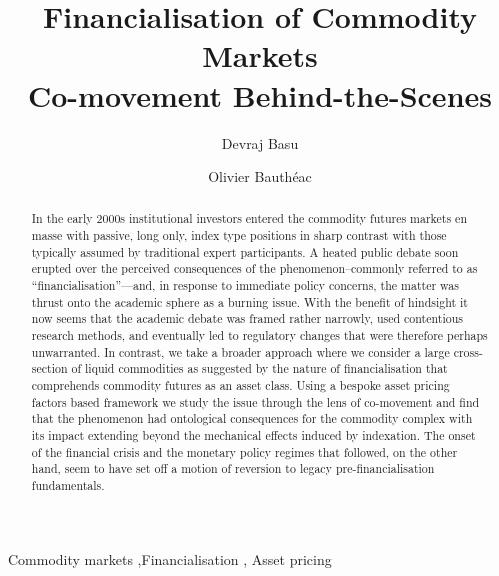 \documentclass[
  authoryear,
  preprint,
  3p]{elsarticle}
\begin{document}
\begin{frontmatter}
\title{Financialisation of Commodity Markets \\\large{Co-movement
Behind-the-Scenes} }
\author[1]{Devraj Basu%
%
}
\author[1]{Olivier Bauthéac%
%
}




        
\begin{abstract}
In the early 2000s institutional investors entered the commodity futures
markets en masse with passive, long only, index type positions in sharp
contrast with those typically assumed by traditional expert
participants. A heated public debate soon erupted over the perceived
consequences of the phenomenon--commonly referred to as
``financialisation''---and, in response to immediate policy concerns,
the matter was thrust onto the academic sphere as a burning issue. With
the benefit of hindsight it now seems that the academic debate was
framed rather narrowly, used contentious research methods, and
eventually led to regulatory changes that were therefore perhaps
unwarranted. In contrast, we take a broader approach where we consider a
large cross-section of liquid commodities as suggested by the nature of
financialisation that comprehends commodity futures as an asset class.
Using a bespoke asset pricing factors based framework we study the issue
through the lens of co-movement and find that the phenomenon had
ontological consequences for the commodity complex with its impact
extending beyond the mechanical effects induced by indexation. The onset
of the financial crisis and the monetary policy regimes that followed,
on the other hand, seem to have set off a motion of reversion to legacy
pre-financialisation fundamentals.
\end{abstract}





\begin{keyword}
    Commodity markets \sep Financialisation \sep 
    Asset pricing
\end{keyword}
\end{frontmatter}
    

\newpage
\end{document}
